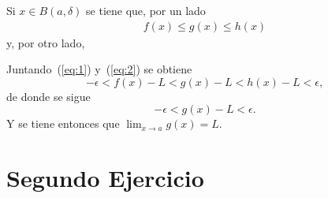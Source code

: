 \documentclass[fleqn,leqno,12pt,letterpaper,final]{article}
\begin{document}
Si $x\in B(a,\delta)$ se tiene que, por un lado
\begin{align}\label{eq:1}
	f(x)\leq g(x)\leq h(x)
\end{align}
y, por otro lado,

Juntando~(\ref{eq:1}) y~(\ref{eq:2}) se obtiene
\[
	-\epsilon<f(x)-L<g(x)-L<h(x)-L<\epsilon,
\]
de donde se sigue
\[
	-\epsilon<g(x)-L<\epsilon.
\]
Y se tiene entonces que $ \lim_{x\to a}g(x)=L $.

\section{Segundo Ejercicio}%
\end{document}
